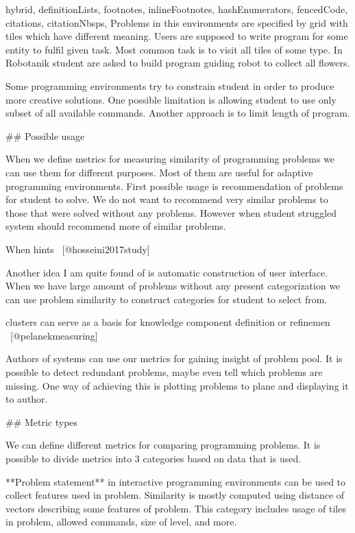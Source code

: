 \documentclass[
  digital, %
  table,   %
  lof,     %
  lot,     %
]{fithesis3}
\begin{document}
\begin{markdown*}{%
  hybrid,
  definitionLists,
  footnotes,
  inlineFootnotes,
  hashEnumerators,
  fencedCode,
  citations,
  citationNbsps,
}
Problems in this environments are specified by grid with tiles which have different meaning. Users are supposed to write program for some entity to fulfil given task. Most common task is to visit all tiles of some type. In Robotanik student are asked to build program guiding robot to collect all flowers.

Some programming environments try to constrain student in order to produce more creative solutions. One possible limitation is allowing student to use only subset of all available commands. Another approach is to limit length of program.

## Possible usage

When we define metrics for measuring similarity of programming problems we can use them for different purposes. Most of them are useful for adaptive programming environments. First possible usage is recommendation of problems for student to solve. We do not want to recommend very similar problems to those that were solved without any problems. However when student struggled system should recommend more of similar problems.


When hints ~[@hosseini2017study]



Another idea I am quite found of is automatic construction of user interface. When we have large amount of problems without any present categorization we can use problem similarity to construct categories for student to select from.

clusters can serve as a basis for knowledge component  definition  or  refinemen ~[@pelanekmeasuring]

Authors of systems can use our metrics for gaining insight of problem pool. It is possible to detect redundant problems, maybe even tell which problems are missing. One way of achieving this is plotting problems to plane and displaying it to author.

## Metric types

We can define different metrics for comparing programming problems. It is possible to divide metrics into 3 categories based on data that is used.

**Problem statement** in interactive programming environments can be used to collect features used in problem. Similarity is mostly computed using distance of vectors describing some features of problem. This category includes usage of tiles in problem, allowed commands, size of level, and more.


\end{markdown*}
\end{document}
